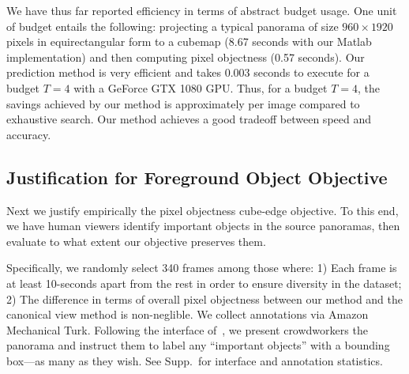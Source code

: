 We have thus far reported efficiency in terms of abstract budget usage.
One unit of budget entails the following: projecting 
a typical panorama of size $960\times 1920$ pixels in equirectangular form to a cubemap (8.67 seconds with our Matlab implementation) and then computing pixel objectness (0.57 seconds). Our prediction method is very efficient and takes $0.003$ seconds to execute for a budget $T=4$ with a GeForce GTX 1080 GPU.  
Thus, for a budget $T=4$, the savings achieved by our method is approximately  per image compared to exhaustive search.     Our method achieves a good tradeoff between speed and accuracy.






\vspace{-10pt}

\subsection{Justification for Foreground Object Objective}\label{sec:preserve_object}


Next we justify empirically the pixel objectness cube-edge objective.  To this end, we have human viewers identify important objects in the source panoramas, then evaluate to what extent our objective preserves them. 

Specifically, we randomly select 340 frames among those where: 1) Each frame is at least 10-seconds apart from the rest in order to ensure diversity in the dataset; 2) The difference in terms of overall pixel objectness between our method and the canonical view method is non-neglible.  %
We collect annotations via Amazon Mechanical Turk.   Following the interface of~\cite{hu2017deep}, we present crowdworkers the panorama and instruct them to label any ``important objects'' with a bounding box---as many as they wish.
See Supp.~for interface and annotation statistics.  




